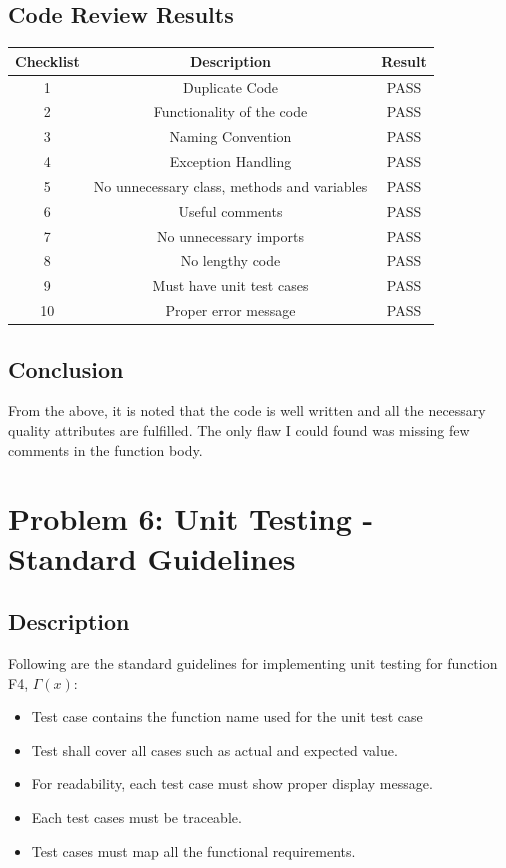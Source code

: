 \documentclass[a4paper,12pt]{article}
\begin{document}
    \subsection{Code Review Results}
    \begin{center}
    \begin{tabular}{||c c c||} 
     \hline
     Checklist & Description & Result \\ 
     \hline\hline
     1 & Duplicate Code & PASS \\ 
     \hline
     2 & Functionality of the code & PASS \\
     \hline
     3 & Naming Convention & PASS \\
     \hline
     4 & Exception Handling & PASS \\
     \hline
     5 & No unnecessary class, methods and variables & PASS \\ 
     \hline
     6 & Useful comments & PASS \\
     \hline
     7 & No unnecessary imports & PASS \\
     \hline
     8 & No lengthy code & PASS \\
     \hline
     9 & Must have unit test cases & PASS \\
     \hline
     10 & Proper error message & PASS \\
     \hline
    \end{tabular}
    \end{center}
    
    \subsection{Conclusion}
    From the above, it is noted that the code is well written and all the necessary quality attributes are fulfilled. The only flaw I could found was missing few comments in the function body.
    
    \newpage
    
    \section{Problem 6: Unit Testing - Standard Guidelines}
    \subsection{Description}
    Following are the standard guidelines for implementing unit testing for function F4, $\Gamma(x)$:
    \begin{itemize}
        \item Test case contains the function name used for the unit test case
        \item Test shall cover all cases such as actual and expected value.
        \item For readability, each test case must show proper display message.
        \item Each test cases must be traceable.
        \item Test cases must map all the functional requirements.
    \end{itemize}
    
\end{document}
